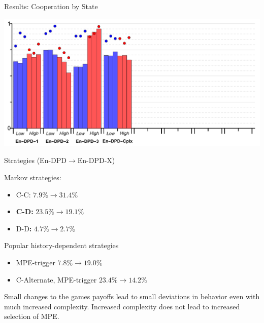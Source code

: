 \documentclass{beamer}
\begin{document}
\begin{frame}{Results: Cooperation by State}
\begin{card}
\begin{center}
	\includegraphics[width=1.0\textwidth]{./i/col_bar_StateCoop_block_EnDPD_C.pdf}
\end{center}
\end{card}
\end{frame}

\begin{frame}{Strategies (En-DPD$\rightarrow$En-DPD-X)}
\begin{card}
 Markov strategies:
\begin{itemize}
\item C-C: $7.9\%\rightarrow31.4\%$
\item \textbf{C-D:} $23.5\%\rightarrow19.1\%$
\item D-D\textbf{:} $4.7\%\rightarrow2.7\%$
\end{itemize}
\end{card}
\begin{card}
Popular history-dependent strategies
\begin{itemize}
\item MPE-trigger $7.8\%\rightarrow19.0\%$
\item C-Alternate, MPE-trigger $23.4\%\rightarrow14.2\%$
\end{itemize}
\end{card}
\end{frame}

\begin{frame}
\begin{card}[Result 4]
Small changes to the games payoffs lead to small deviations
in behavior even with much increased complexity. Increased complexity
does not lead to increased selection of MPE.
\end{card}
\end{frame}
\end{document}
